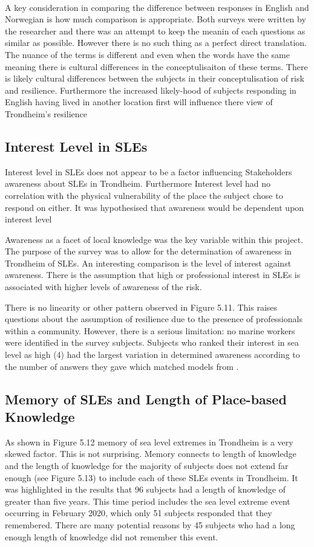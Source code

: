 \paragraph{}
A key consideration in comparing the difference between responses in English and Norwegian is how much comparison is appropriate. Both surveys were written by the researcher and there was an attempt to keep the meanin of each questions as similar as possible. However there is no such thing as a perfect direct translation. The nuance of the terms is different and even when the words have the same meaning there is cultural differences in the conceptulisaiton of these terms. There is likely cultural differences between the subjects in their conceptulisation of risk and resilience. Furthermore the increased likely-hood of subjects responding in English having lived in another location first will influence there view of Trondheim's resilience


\subsection{Interest Level in SLEs}
Interest level in SLEs does not appear to be a factor influencing Stakeholders awareness about SLEs in Trondheim. Furthermore Interest level had no correlation with the physical vulnerability of the place the subject chose to respond on either. It was hypothesised that awareness would be dependent upon interest level 

  Awareness as a facet of local knowledge was the key variable within this project. The purpose of the survey was to allow for the determination of awareness in Trondheim of SLEs. An interesting comparison is the level of interest against awareness. There is the assumption that high or professional interest in SLEs is associated with higher levels of awareness of the risk. 


  There is no linearity or other pattern observed in Figure 5.11. This raises questions about the assumption of resilience due to the presence of professionals within a community. However, there is a serious limitation: no marine workers were identified in the survey subjects. Subjects who ranked their interest in sea level as high (4) had the largest variation in determined awareness according to the number of answers they gave which matched models from \cite{kartverket_se_2020}. 

\subsection{Memory of SLEs and Length of Place-based Knowledge}
As shown in Figure 5.12 memory of sea level extremes in Trondheim is a very skewed factor. This is not surprising. Memory connects to length of knowledge and the length of knowledge for the majority of subjects does not extend far enough (see Figure 5.13) to include each of these SLEs events in Trondheim. It was highlighted in the results that 96 subjects had a length of knowledge of greater than five years. This time period includes the sea level extreme event occurring in February 2020, which only 51 subjects responded that they remembered. There are many potential reasons by 45 subjects who had a long enough length of knowledge did not remember this event. 
